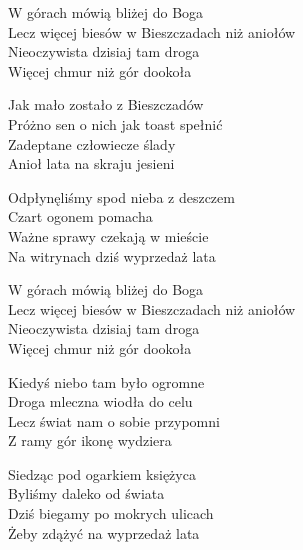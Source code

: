 \begin{text}
W górach mówią bliżej do Boga\\
Lecz więcej biesów w Bieszczadach niż aniołów\\
Nieoczywista dzisiaj tam droga\\
Więcej chmur niż gór dookoła

Jak mało zostało z Bieszczadów\\
Próżno sen o nich jak toast spełnić\\
Zadeptane człowiecze ślady\\
Anioł lata na skraju jesieni

Odpłynęliśmy spod nieba z deszczem\\
Czart ogonem pomacha\\
Ważne sprawy czekają w mieście\\
Na witrynach dziś wyprzedaż lata

W górach mówią bliżej do Boga\\
Lecz więcej biesów w Bieszczadach niż aniołów\\
Nieoczywista dzisiaj tam droga\\
Więcej chmur niż gór dookoła

Kiedyś niebo tam było ogromne\\
Droga mleczna wiodła do celu\\
Lecz świat nam o sobie przypomni\\
Z ramy gór ikonę wydziera

Siedząc pod ogarkiem księżyca\\
Byliśmy daleko od świata\\
Dziś biegamy po mokrych ulicach\\
Żeby zdążyć na wyprzedaż lata
\end{text}